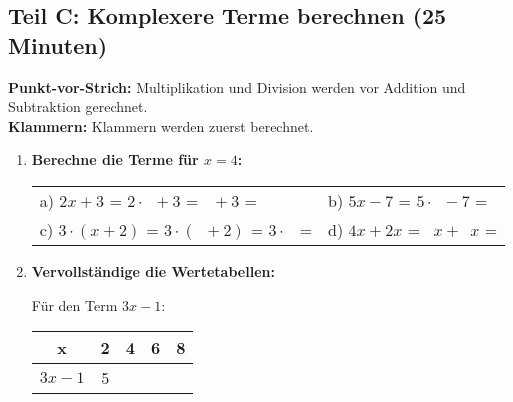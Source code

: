 \subsection*{Teil C: Komplexere Terme berechnen (25 Minuten)}

\begin{merkbox}[Rechenregeln]
    \textbf{Punkt-vor-Strich:} Multiplikation und Division werden vor Addition und Subtraktion gerechnet.\\
    \textbf{Klammern:} Klammern werden zuerst berechnet.
\end{merkbox}

\begin{enumerate}[label=\arabic*., resume]

    \item \textbf{Berechne die Terme für $x = 4$:}

    \vspace{0.5cm}

    \begin{tabular}{ll}
        a) $2x + 3$ = $2 \cdot \phantom{0} + 3$ = $\phantom{0} + 3$ = \underline{\hspace{2cm}} & b) $5x - 7$ = $5 \cdot \phantom{0} - 7$ = \underline{\hspace{2cm}} \\[4ex]
        c) $3 \cdot (x + 2)$ = $3 \cdot (\phantom{0} + 2)$ = $3 \cdot \phantom{0}$ = \underline{\hspace{2cm}} & d) $4x + 2x$ = $\phantom{0}x + \phantom{0}x$ = \underline{\hspace{2cm}}
    \end{tabular}

    \vspace{1cm}

    \item \textbf{Vervollständige die Wertetabellen:}

    \vspace{0.5cm}

    Für den Term $3x - 1$:

    \begin{center}
        \begin{tabular}{|c|c|c|c|c|}
            \hline
            x & 2 & 4 & 6 & 8 \\
            \hline
            $3x - 1$ & 5 & & & \\
            \hline
        \end{tabular}
    \end{center}


\end{enumerate}
